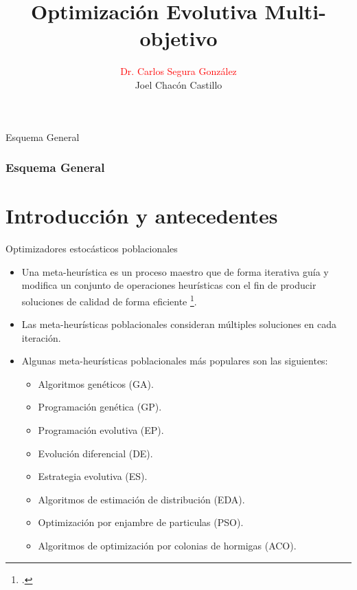 \documentclass{beamer}
\title[Your Short Title]{Optimización Evolutiva Multi-objetivo}
\author{\textcolor{red}{Dr. Carlos Segura González} \\ Joel Chacón Castillo}
\institute{Centro de Investigación de Matemáticas}
\begin{document}
\begin{frame}
  \titlepage
\end{frame}

\begin{frame}{Esquema General}
\frametitle{Esquema General}
\tableofcontents
\end{frame}


\section{Introducción y antecedentes}



\begin{frame}{Optimizadores estocásticos poblacionales}
    \begin{itemize}
    \scriptsize
    \justifying
        \item Una meta-heurística es un proceso maestro que de forma iterativa guía y modifica un conjunto de operaciones heurísticas con el fin de producir soluciones de calidad de forma eficiente \footcite{voss2012meta}.
        \item Las meta-heurísticas poblacionales consideran múltiples soluciones en cada iteración.
        \item Algunas meta-heurísticas poblacionales más populares son las siguientes:
        \begin{itemize}
        \scriptsize
            \item Algoritmos genéticos (GA).
            \item Programación genética (GP).
            \item Programación evolutiva (EP).
            \item Evolución diferencial (DE).
            \item Estrategia evolutiva (ES).
            \item Algoritmos de estimación de distribución (EDA).
            \item Optimización por enjambre de particulas (PSO).
            \item Algoritmos de optimización por colonias de hormigas (ACO).
        \end{itemize}{}
    \end{itemize}{}
\end{frame}{}
\end{document}
